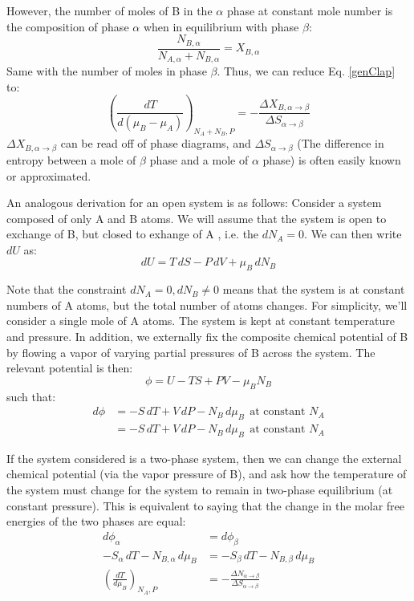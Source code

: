 \documentclass[12pt]{article}
\begin{document}
However, the number of moles of B in the $\alpha$ phase at constant mole number is the composition of phase $\alpha$ when in equilibrium with phase $\beta$: 
$$\frac{N_{B,\alpha}}{N_{A,\alpha}+N_{B,\alpha}}=X_{B,\alpha}$$
Same with the number of moles in phase $\beta$. Thus, we can reduce Eq. \ref{genClap} to:
\begin{equation}
\left(\frac{dT}{d(\mu_B-\mu_A)}\right)_{N_A+N_B,P} =-\frac{\Delta X_{B,\alpha \to \beta}}{\Delta S_{\alpha \to \beta}}
\end{equation}
$\Delta X_{B,\alpha \to \beta}$ can be read off of phase diagrams, and $\Delta S_{\alpha \to \beta}$ (The difference in entropy between a mole of $\beta$ phase and a mole of $\alpha$ phase) is often easily known or approximated.

An analogous derivation for an open system is as follows:
Consider a system composed of only A and B atoms. We will assume that the system is open to exchange of B, but closed to exhange of A , i.e. the $dN_A=0$. We can then write $dU$ as:
\begin{equation} 
dU=T\, dS - P\, dV + \mu_B \, dN_B
\end{equation} 

Note that the constraint $dN_A=0, dN_B\neq 0$ means that the system is at constant numbers of A atoms, but the total number of atoms changes. For simplicity, we'll consider a single mole of A atoms. The system is kept at constant temperature and pressure. In addition, we externally fix the composite chemical potential of B by flowing a vapor of varying partial pressures of B across the system. The relevant potential is then:
\begin{equation}
\phi = U-TS+PV-\mu_B N_B
\end{equation}
such that:
\begin{equation}\begin{aligned}
d\phi &= -S\,dT+V\,dP-N_B\, d\mu_B \ \ \text{at constant $N_A$} \\
&= -S\,dT+V\,dP-N_B\, d\mu_B \ \ \text{at constant $N_A$}
\end{aligned}\end{equation}

If the system considered is a two-phase system, then we can  change the external chemical potential (via the vapor pressure of B), and ask how the temperature of the system must change for the system to remain in two-phase equilibrium (at constant pressure). This is equivalent to saying that the change in the molar free energies of the two phases are equal:
\begin{align}
d\phi_\alpha &= d\phi_\beta \\
-S_\alpha\,dT -N_{B,\alpha}\,d\mu_B &= -S_\beta\,dT -N_{B,\beta}\, d\mu_B\\
\left(\frac{dT}{d\mu_B}\right)_{N_A,P}&=-\frac{\Delta N_{\alpha \to \beta}}{\Delta S_{\alpha \to \beta}}\label{genClap2}
\end{align}
\end{document}
